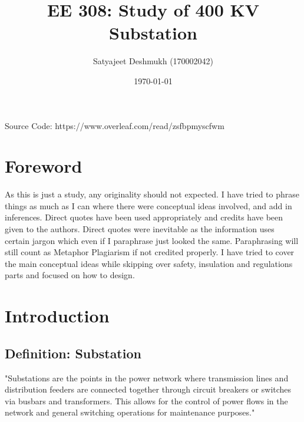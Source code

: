 \documentclass[11pt, a4paper]{article} %
\title{EE 308: Study of 400 KV Substation} %
\author{Satyajeet Deshmukh (170002042)}    %
\date{\small \today} %
\begin{document}
%

\maketitle %

\begin{center}
    Source Code: https://www.overleaf.com/read/zsfbpmyscfwm
\end{center}

\setcounter{page}{1} %

\section{Foreword}
As this is just a study, any originality should not expected. I have tried to phrase things as much as I can where there were conceptual ideas involved, and add in inferences. Direct quotes have been used appropriately and credits have been given to the authors. Direct quotes were inevitable as the information uses certain jargon which even if I paraphrase just looked the same. Paraphrasing will still count as Metaphor Plagiarism if not credited properly. I have tried to cover the main conceptual ideas while skipping over safety, insulation and regulations parts and focused on how to design.

\section{Introduction} %
\subsection{Definition: Substation} %
"Substations are the points in the power network where transmission lines and distribution feeders are connected together through circuit breakers or switches via busbars and transformers. This allows for the control of power flows in the network and general switching operations for maintenance purposes." \citep[Chap.3]{book1}
\end{document}
